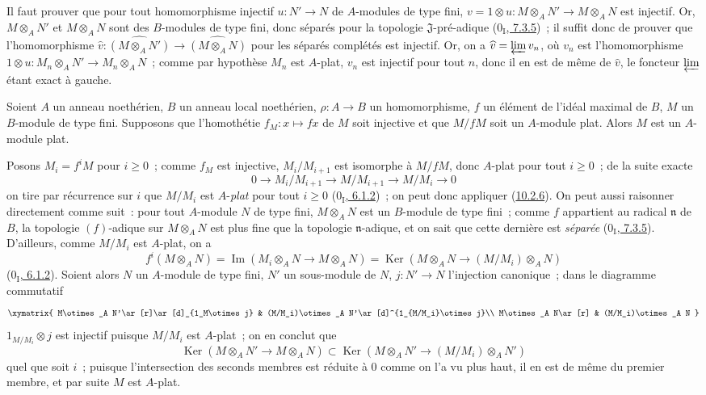 Il faut prouver que pour tout homomorphisme injectif $u:N'\to N$ de
$A$-modules de type fini, $v=1\otimes u:M\otimes_A N'\to M\otimes_A N$ est
injectif. Or, $M\otimes_A N'$ et $M\otimes_A N$ sont des $B$-modules de type
fini, donc séparés pour la topologie $\mathfrak{J}$-pré-adique
(\hyperref[0.7.3.5-fr]{$0_{\mathrm I}$, 7.3.5})~; il suffit donc de prouver que
l'homomorphisme
$\widehat v:\widehat{(M\otimes_A N')}\to\widehat{(M\otimes_A N)}$ pour les
séparés complétés est injectif. Or, on a $\widehat v=\varprojlim v_n$, où
$v_n$ est l'homomorphisme $1\otimes u:M_n\otimes_A N'\to M_n\otimes_A N$~;
comme par hypothèse $M_n$ est $A$-plat, $v_n$ est injectif pour tout $n$, donc
il en est de même de $\widehat v$, le foncteur $\varprojlim$ étant exact à gauche.

\begin{corollary}[10.2.7]
\label{0.10.2.7-fr}
Soient $A$ un anneau noethérien, $B$ un anneau local noethérien,
$\rho:A\to B$ un homomorphisme, $f$ un élément de l'idéal maximal de $B$, $M$
un $B$-module de type fini. Supposons que l'homothétie
$f_M:x\mapsto fx$ de $M$ soit injective et que $M/fM$ soit un $A$-module
plat. Alors $M$ est un $A$-module plat.
\end{corollary}

Posons $M_i=f^iM$ pour $i\geq0$~; comme $f_M$ est injective,
$M_i/M_{i+1}$ est isomorphe à $M/fM$, donc $A$-plat pour tout $i\geq0$~; de
la suite exacte
\[
  0\longrightarrow M_i/M_{i+1}\longrightarrow M/M_{i+1}
  \longrightarrow M/M_i\longrightarrow0
\]
on tire par récurrence sur $i$ que $M/M_i$ est $A$-\emph{plat} pour tout
$i\geq0$ (\hyperref[0.6.1.2-fr]{$0_{\mathrm I}$, 6.1.2})~; on peut donc
appliquer (\hyperref[0.10.2.6-fr]{10.2.6}). On peut aussi raisonner directement
comme suit~: pour tout $A$-module $N$ de type fini, $M\otimes_A N$ est un
$B$-module de type fini~; comme $f$ appartient au radical $\mathfrak n$ de
$B$, la topologie $(f)$-adique sur $M\otimes_A N$ est plus fine que la
topologie $\mathfrak n$-adique, et on sait que cette dernière est \emph{séparée}
(\hyperref[0.7.3.5-fr]{$0_{\mathrm I}$, 7.3.5}). D'ailleurs, comme $M/M_i$ est
$A$-plat, on a
\[
  f^i(M\otimes_A N)=\operatorname{Im}(M_i\otimes_A N\to M\otimes_A N)
  =\operatorname{Ker}(M\otimes_A N\to(M/M_i)\otimes_A N)
\]
(\hyperref[0.6.1.2-fr]{$0_{\mathrm I}$, 6.1.2}). Soient alors $N$ un
$A$-module de type fini, $N'$ un sous-module de $N$, $j:N'\to N$ l'injection
canonique~; dans le diagramme commutatif
\[
\xymatrix{
  M\otimes_A N'\ar[r]\ar[d]_{1_M\otimes j} &
  (M/M_i)\otimes_A N'\ar[d]^{1_{M/M_i}\otimes j}\\
  M\otimes_A N\ar[r] & (M/M_i)\otimes_A N
}
\]
$1_{M/M_i}\otimes j$ est injectif puisque $M/M_i$ est $A$-plat~; on en
conclut que
\[
  \operatorname{Ker}(M\otimes_A N'\to M\otimes_A N)
  \subset\operatorname{Ker}(M\otimes_A N'\to(M/M_i)\otimes_A N')
\]
quel que soit $i$~; puisque l'intersection des seconds membres est réduite à
$0$ comme on l'a vu plus haut, il en est de même du premier membre, et par
suite $M$ est $A$-plat.

